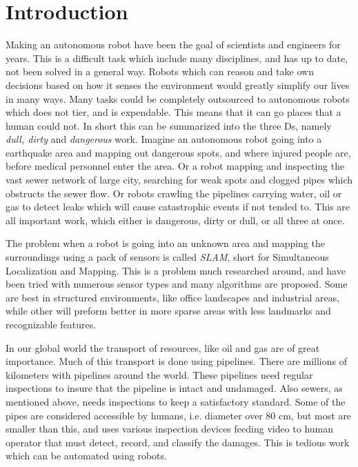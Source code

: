 
\chapter{Introduction}
Making an autonomous robot have been the goal of scientists and engineers for years. This
is a difficult task which include many disciplines, and has up to date, not been solved in
a general way. Robots which can reason and take own decisions based on how it senses the
environment would greatly simplify our lives in many ways. Many tasks could be completely
outsourced to autonomous robots which does not tier, and is expendable. This means that it
can go places that a human could not. In short this can be summarized into the three Ds,
namely \emph{dull, dirty} and \emph{dangerous} work. Imagine an autonomous robot going
into a earthquake area and mapping out dangerous spots, and where injured people are,
before medical personnel enter the area. Or a robot mapping and inspecting the vast sewer
network of large city, searching for weak spots and clogged pipes which obstructs the
sewer flow. Or robots crawling the pipelines carrying water, oil or gas to detect leaks
which will cause catastrophic events if not tended to. This are all important work, which
either is dangerous, dirty or dull, or all three at once.

The problem when a robot is going into an unknown area and mapping the surroundings using
a pack of sensors is called \emph{SLAM}, short for Simultaneous Localization and Mapping.
This is a problem much researched around, and have been tried with numerous sensor types
and many algorithms are proposed. Some are best in structured environments, like office
landscapes and industrial areas, while other will preform better in more sparse areas with
less landmarks and recognizable features. 

In our global world the transport of resources, like oil and gas are of great importance. Much of this
transport is done using pipelines. There are millions of kilometers with pipelines around
the world. These pipelines need regular inspections to insure that the pipeline is intact
and undamaged. Also sewers, as mentioned above, needs inspections to keep a satisfactory
standard. Some of the pipes are considered accessible by humans, i.e. diameter over 80 cm,
but most are smaller than this, and uses various inspection devices feeding video to human
operator that must detect, record, and classify the damages. This is tedious work which
can be automated using robots. \cite{MAKRO-project}

